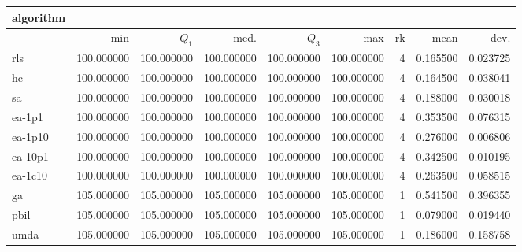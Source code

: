 \begin{tabular}{@{}l*{5}{>{{}}N{3}{0}}>{{}}N{2}{0}N{1}{3}N{1}{3}@{}}
\toprule
{algorithm} &  &  \\
\midrule
& {min} & {$Q_1$} & {med.} & {$Q_3$} & {max} & {rk} & {mean} & {dev.} \\
\midrule
rls & 100.000000 & 100.000000 & 100.000000 & 100.000000 & 100.000000 & 4 & 0.165500 & 0.023725 \\
 hc & 100.000000 & 100.000000 & 100.000000 & 100.000000 & 100.000000 & 4 & 0.164500 & 0.038041 \\
 sa & 100.000000 & 100.000000 & 100.000000 & 100.000000 & 100.000000 & 4 & 0.188000 & 0.030018 \\
 ea-1p1 & 100.000000 & 100.000000 & 100.000000 & 100.000000 & 100.000000 & 4 & 0.353500 & 0.076315 \\
 ea-1p10 & 100.000000 & 100.000000 & 100.000000 & 100.000000 & 100.000000 & 4 & 0.276000 & 0.006806 \\
 ea-10p1 & 100.000000 & 100.000000 & 100.000000 & 100.000000 & 100.000000 & 4 & 0.342500 & 0.010195 \\
 ea-1c10 & 100.000000 & 100.000000 & 100.000000 & 100.000000 & 100.000000 & 4 & 0.263500 & 0.058515 \\
 ga & {\color{blue}} 105.000000 & {\color{blue}} 105.000000 & {\color{blue}} 105.000000 & {\color{blue}} 105.000000 & {\color{blue}} 105.000000 & 1 & 0.541500 & 0.396355 \\
 pbil & {\color{blue}} 105.000000 & {\color{blue}} 105.000000 & {\color{blue}} 105.000000 & {\color{blue}} 105.000000 & {\color{blue}} 105.000000 & 1 & 0.079000 & 0.019440 \\
 umda & {\color{blue}} 105.000000 & {\color{blue}} 105.000000 & {\color{blue}} 105.000000 & {\color{blue}} 105.000000 & {\color{blue}} 105.000000 & 1 & 0.186000 & 0.158758 \\
 \bottomrule
\end{tabular}
